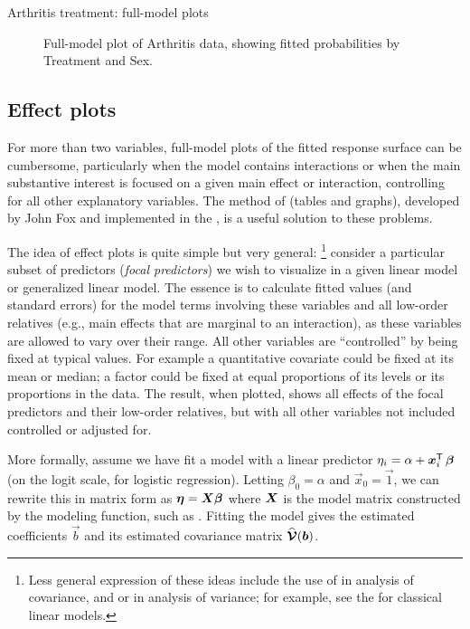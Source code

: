 \documentclass[11pt]{book}\usepackage[]{graphicx}\usepackage[]{color}
\newenvironment{knitrout}{}{} %
\renewenvironment{knitrout}{\small\renewcommand{\baselinestretch}{.85}}{} %
\begin{document}
\begin{Example}{Arthritis treatment: full-model plots}
\begin{knitrout}
\begin{figure}[!htbp]
\caption[Full-model plot of Arthritis data, showing fitted probabilities by Treatment and Sex]{Full-model plot of Arthritis data, showing fitted probabilities by Treatment and Sex.\label{fig:arth-full2}}
\end{figure}


\end{knitrout}

\end{Example}

\subsection{Effect plots}\label{sec:logist-effplots}
For more than two variables, full-model plots of the fitted response surface can
be cumbersome, particularly when the model contains interactions or when the main
substantive interest is focused on a given main effect or interaction, controlling
for all other explanatory variables.
The method of  (tables and graphs), developed by
John Fox \citeyearpar{Fox:87,Fox:03:effects} and implemented in the ,
is a useful solution to these problems.

The idea of effect plots is quite simple but very general:%
\footnote{
Less general expression of these ideas include the use of 
in analysis of covariance, and  
or  \citep{Searle-etal:80}
in analysis of variance; for example, see the  for classical linear models.
}
consider a particular
subset of predictors (\emph{focal predictors}) we wish to visualize in a given
linear model or generalized linear model.  The essence is to calculate fitted
values (and standard errors) for the model terms involving these variables
and all low-order relatives (e.g., main effects that are marginal to an interaction),
as these variables are allowed to vary over their range.  All other variables
are ``controlled'' by being fixed at typical values. For example a quantitative
covariate could be fixed at its mean or median; a factor could be fixed at
equal proportions of its levels or its proportions in the data.
The result, when plotted, shows all effects of the focal predictors and their
low-order relatives, but with all other variables not included controlled or
adjusted for.

More formally, assume we have fit a model with a linear predictor
$\eta_i =  \alpha + \bm{x}_{i}^\mathsf{T} \,  \bm{\beta} $ 
(on the logit scale, for logistic regression).
Letting $\beta_0 = \alpha$ and $\vec{x}_0 = \vec{1}$, we can rewrite this
in matrix form as $\bm{\eta} = \bm{X} \bm{\beta}$ where $\bm{X}$ is
the model matrix constructed by the modeling function, such as .
Fitting the model gives the estimated coefficients $\vec{b}$ and
its estimated covariance matrix $\widehat{\bm{\mathcal{V}}} (\bm{b})$.
\end{document}
